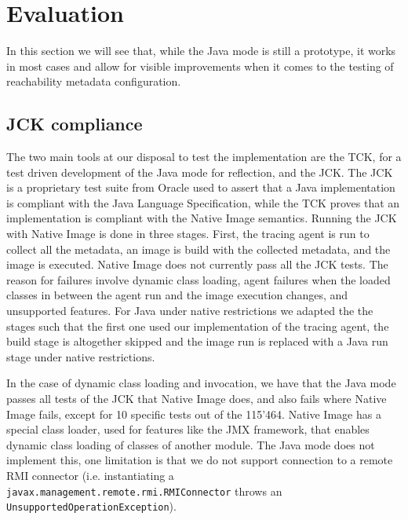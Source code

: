 

\chapter{Evaluation}
In this section we will see that, while the Java mode is still a prototype, it works in most cases and allow for visible improvements when it comes to the testing of reachability metadata configuration.

\section{JCK compliance}
The two main tools at our disposal to test the implementation are the TCK, for a test driven development of the Java mode for reflection, and the JCK.
The JCK is a proprietary test suite from Oracle used to assert that a Java implementation is compliant with the Java Language Specification, while the TCK proves that an implementation is compliant with
the Native Image semantics.
Running the JCK with Native Image is done in three stages. First, the tracing agent is run to collect all the metadata, an image is build with the collected metadata, and the image is executed. 
Native Image does not currently pass all the JCK tests. The reason for failures involve dynamic class loading, agent failures when the loaded classes in between the agent run and the image execution changes, and unsupported features.
For Java under native restrictions we adapted the the stages such that the first one used our implementation of the tracing agent, the build stage is altogether skipped and the image run is replaced with a Java run stage under native restrictions.

In the case of dynamic class loading and invocation, we have that the Java mode passes all tests of the JCK that Native Image does, and also fails where Native Image fails, except for 10 specific tests out of the 115'464.
Native Image has a special class loader, used for features like the JMX framework, that enables dynamic class loading of classes of another module. The Java mode does not implement this, one limitation is that we do not support connection to a remote RMI connector (i.e. instantiating a \verb|javax.management.remote.rmi.RMIConnector| throws an \verb|UnsupportedOperationException|).

